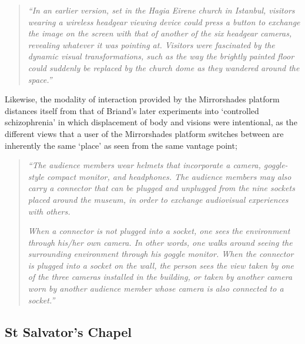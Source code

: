 \begin{quote}
	\textit{``In an earlier version, set in the Hagia Eirene church in Istanbul, visitors wearing a wireless headgear viewing device could press a button to exchange the image on the screen with that of another of the six headgear cameras, revealing whatever it was pointing at. Visitors were fascinated by the dynamic visual transformations, such as the way the brightly painted floor could suddenly be replaced by the church dome as they wandered around the space.''}~\cite{Jones2006}
\end{quote}

Likewise, the modality of interaction provided by the Mirrorshades platform distances itself from that of Briand's later experiments into `controlled schizophrenia' in which displacement of body and visions were intentional, as the different views that a user of the Mirrorshades platform switches between are inherently the same `place' as seen from the same vantage point;

\begin{quote}
	\textit{``The audience members wear helmets that incorporate a camera, goggle-style compact monitor, and headphones. The audience members may also carry a connector that can be plugged and unplugged from the nine sockets placed around the museum, in order to exchange audiovisual experiences with others.}

	\textit{When a connector is not plugged into a socket, one sees the environment through his/her own camera. In other words, one walks around seeing the surrounding environment through his goggle monitor. When the connector is plugged into a socket on the wall, the person sees the view taken by one of the three cameras installed in the building, or taken by another camera worn by another audience member whose camera is also connected to a socket.''}~\cite{Jones2006}
\end{quote}


\subsection{St Salvator's Chapel}

